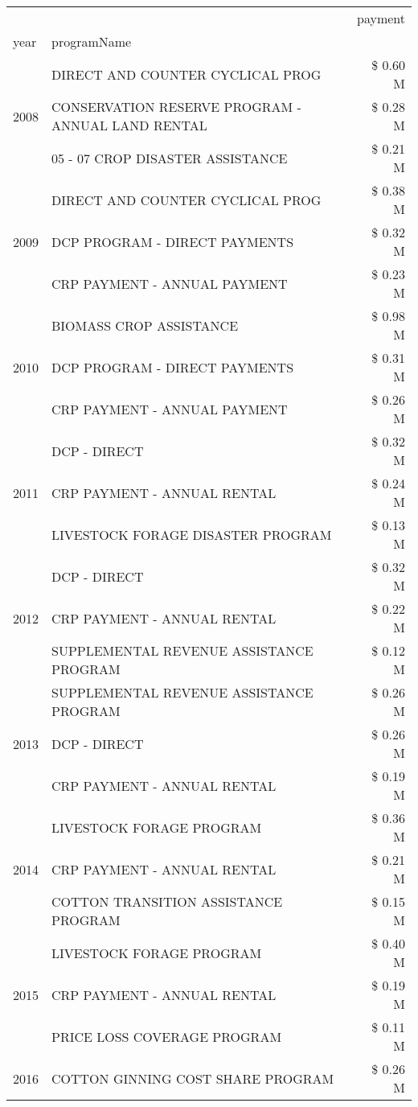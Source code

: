\begin{tabular}{llr}
\toprule
 &  & payment \\
year & programName &  \\
\midrule
\multirow[t]{3}{*}{2008} & DIRECT AND COUNTER CYCLICAL PROG & \$ 0.60 M \\
 & CONSERVATION RESERVE PROGRAM - ANNUAL LAND RENTAL & \$ 0.28 M \\
 & 05 - 07 CROP DISASTER ASSISTANCE & \$ 0.21 M \\
\cline{1-3}
\multirow[t]{3}{*}{2009} & DIRECT AND COUNTER CYCLICAL PROG & \$ 0.38 M \\
 & DCP PROGRAM - DIRECT PAYMENTS & \$ 0.32 M \\
 & CRP PAYMENT - ANNUAL PAYMENT & \$ 0.23 M \\
\cline{1-3}
\multirow[t]{3}{*}{2010} & BIOMASS CROP ASSISTANCE & \$ 0.98 M \\
 & DCP PROGRAM - DIRECT PAYMENTS & \$ 0.31 M \\
 & CRP PAYMENT - ANNUAL PAYMENT & \$ 0.26 M \\
\cline{1-3}
\multirow[t]{3}{*}{2011} & DCP - DIRECT & \$ 0.32 M \\
 & CRP PAYMENT - ANNUAL RENTAL & \$ 0.24 M \\
 & LIVESTOCK FORAGE DISASTER PROGRAM & \$ 0.13 M \\
\cline{1-3}
\multirow[t]{3}{*}{2012} & DCP - DIRECT & \$ 0.32 M \\
 & CRP PAYMENT - ANNUAL RENTAL & \$ 0.22 M \\
 & SUPPLEMENTAL REVENUE ASSISTANCE PROGRAM & \$ 0.12 M \\
\cline{1-3}
\multirow[t]{3}{*}{2013} & SUPPLEMENTAL REVENUE ASSISTANCE PROGRAM & \$ 0.26 M \\
 & DCP - DIRECT & \$ 0.26 M \\
 & CRP PAYMENT - ANNUAL RENTAL & \$ 0.19 M \\
\cline{1-3}
\multirow[t]{3}{*}{2014} & LIVESTOCK FORAGE PROGRAM & \$ 0.36 M \\
 & CRP PAYMENT - ANNUAL RENTAL & \$ 0.21 M \\
 & COTTON TRANSITION ASSISTANCE PROGRAM & \$ 0.15 M \\
\cline{1-3}
\multirow[t]{3}{*}{2015} & LIVESTOCK FORAGE PROGRAM & \$ 0.40 M \\
 & CRP PAYMENT - ANNUAL RENTAL & \$ 0.19 M \\
 & PRICE LOSS COVERAGE PROGRAM & \$ 0.11 M \\
\cline{1-3}
\multirow[t]{3}{*}{2016} & COTTON GINNING COST SHARE PROGRAM             & \$ 0.26 M \\

\end{tabular}

